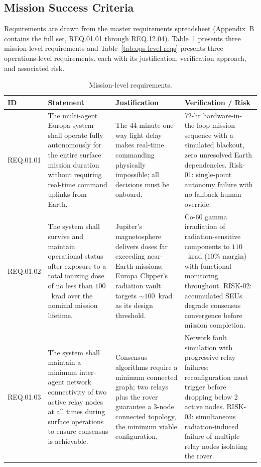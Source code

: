 \documentclass[11pt]{article}
\begin{document}
\subsection{Mission Success Criteria}

Requirements are drawn from the master requirements spreadsheet (Appendix~B contains the full
set, REQ.01.01 through REQ.12.04). Table~\ref{tab:mission-level-reqs} presents three
mission-level requirements and Table~\ref{tab:ops-level-reqs} presents three operations-level
requirements, each with its justification, verification approach, and associated risk.

\begin{table}[H]
\centering
\small
\begin{tabular}{p{1.5cm}p{5.3cm}p{4cm}p{3.2cm}}
\toprule
\textbf{ID} & \textbf{Statement} & \textbf{Justification} & \textbf{Verification / Risk} \\
\midrule
REQ.01.01 &
The multi-agent Europa system shall operate fully autonomously for the entire surface mission
duration without requiring real-time command uplinks from Earth. &
The 44-minute one-way light delay makes real-time commanding physically impossible; all
decisions must be onboard. &
72-hr hardware-in-the-loop mission sequence with a simulated blackout, zero unresolved Earth
dependencies. Risk-01: single-point autonomy failure with no fallback human override. \\
\addlinespace
REQ.01.02 &
The system shall survive and maintain operational status after exposure to a total ionizing dose
of no less than $100$~krad over the nominal mission lifetime. &
Jupiter's magnetosphere delivers doses far exceeding near-Earth missions; Europa Clipper's
radiation vault targets $\sim 100$~krad as its design threshold. &
Co-60 gamma irradiation of radiation-sensitive components to $110$~krad ($10\%$ margin) with
functional monitoring throughout. RISK-02: accumulated SEUs degrade consensus convergence before
mission completion. \\
\addlinespace
REQ.01.03 &
The system shall maintain a minimum inter-agent network connectivity of two active relay nodes
at all times during surface operations to ensure consensus is achievable. &
Consensus algorithms require a minimum connected graph; two relays plus the rover guarantee a
3-node connected topology, the minimum viable configuration. &
Network fault simulation with progressive relay failures; reconfiguration must trigger before
dropping below 2 active nodes. RISK-03: simultaneous radiation-induced failure of multiple relay
nodes isolating the rover. \\
\bottomrule
\end{tabular}
\caption{Mission-level requirements.}
\label{tab:mission-level-reqs}
\end{table}
\end{document}

